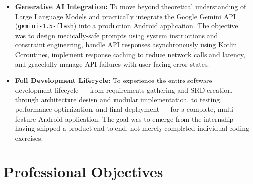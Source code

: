 \documentclass[12pt,a4paper]{report}
\begin{document}
\begin{itemize}
    \item \textbf{Generative AI Integration:} To move beyond theoretical understanding of Large Language Models and practically integrate the Google Gemini API (\texttt{gemini-1.5-flash}) into a production Android application. The objective was to design medically-safe prompts using system instructions and constraint engineering, handle API responses asynchronously using Kotlin Coroutines, implement response caching to reduce network calls and latency, and gracefully manage API failures with user-facing error states.

    \item \textbf{Full Development Lifecycle:} To experience the entire software development lifecycle — from requirements gathering and SRD creation, through architecture design and modular implementation, to testing, performance optimization, and final deployment — for a complete, multi-feature Android application. The goal was to emerge from the internship having shipped a product end-to-end, not merely completed individual coding exercises.
\end{itemize}

\section{Professional Objectives}
\end{document}
